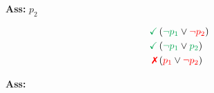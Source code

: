 \begin{minipage}[t]{0.2\textwidth}
  \textbf{Ass:} \underline{} $p_2$
  \centering{}
  \label{fig1}
\end{minipage}
\begin{minipage}[t]{0.2\textwidth}
$$
\begin{aligned}
\text{\textcolor{Green}{\checkmark}} &\left(\text{\textcolor{Green}{$\neg p_1$}} \vee \text{\textcolor{red}{$\neg p_{2}$}}\right) \\
\textcolor{Green}{\checkmark} &\left(\text{\textcolor{Green}{$\neg p_1$}}  \vee \text{\textcolor{Green}{$p_{2}$}}\right) \\
\text{\textcolor{red}{\xmark}} &\left(\text{\textcolor{red}{$p_1$}} \vee  \text{\textcolor{red}{$\neg p_{2}$}}\right)
\end{aligned}
$$
\end{minipage}
\begin{minipage}[t]{0.2\textwidth}
  \textbf{Ass:} \underline{}
  \centering{}
  \label{fig1}
\end{minipage}
